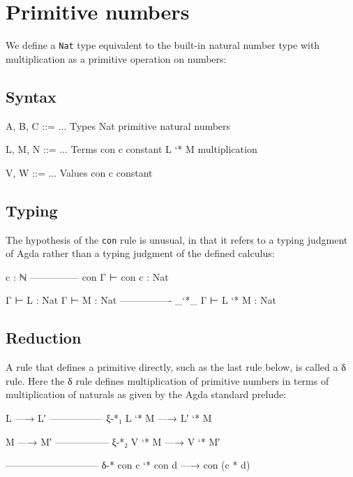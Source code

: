 \hypertarget{primitive-numbers}{%
\section{Primitive numbers}\label{primitive-numbers}}

We define a \texttt{Nat} type equivalent to the built-in natural number
type with multiplication as a primitive operation on numbers:

\hypertarget{syntax}{%
\subsection{Syntax}\label{syntax}}

\begin{myDisplay}
A, B, C ::= ...                     Types
  Nat                                 primitive natural numbers

L, M, N ::= ...                     Terms
  con c                               constant
  L `* M                              multiplication

V, W ::= ...                        Values
  con c                               constant
\end{myDisplay}

\hypertarget{typing}{%
\subsection{Typing}\label{typing}}

The hypothesis of the \texttt{con} rule is unusual, in that it refers to
a typing judgment of Agda rather than a typing judgment of the defined
calculus:

\begin{myDisplay}
c : ℕ
--------------- con
Γ ⊢ con c : Nat

Γ ⊢ L : Nat
Γ ⊢ M : Nat
---------------- _`*_
Γ ⊢ L `* M : Nat
\end{myDisplay}

\hypertarget{reduction}{%
\subsection{Reduction}\label{reduction}}

A rule that defines a primitive directly, such as the last rule below,
is called a δ rule. Here the δ rule defines multiplication of primitive
numbers in terms of multiplication of naturals as given by the Agda
standard prelude:

\begin{myDisplay}
L —→ L′
----------------- ξ-*₁
L `* M —→ L′ `* M

M —→ M′
----------------- ξ-*₂
V `* M —→ V `* M′

----------------------------- δ-*
con c `* con d —→ con (c * d)
\end{myDisplay}

